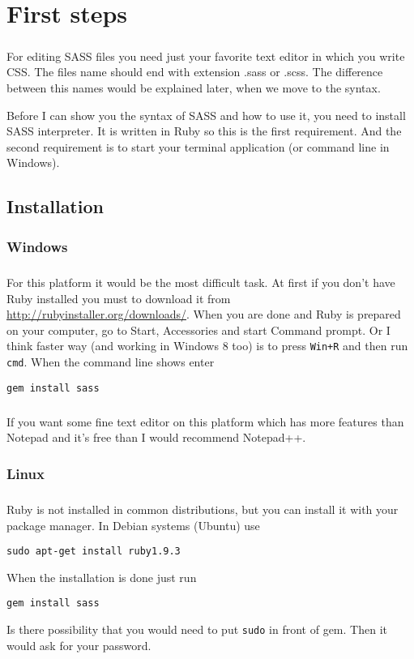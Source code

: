 \chapter{First steps}
\paragraph{}
For editing SASS files you need just your favorite text editor in which you write CSS. The files name should end with extension .sass or .scss. The difference between this names would be explained later, when we move to the syntax.

Before I can show you the syntax of SASS and how to use it, you need to install SASS interpreter. It is written in Ruby so this is the first requirement. And the second requirement is to start your terminal application (or command line in Windows).

\section{Installation}
\subsection{Windows}
\paragraph{}
For this platform it would be the most difficult task. At first if you don't have Ruby installed you must to download it from
\url{http://rubyinstaller.org/downloads/}. When you are done and Ruby is prepared on your computer, go to Start, Accessories and start Command prompt. Or I think faster way (and working in Windows 8 too) is to press \texttt{Win+R} and then run \texttt{cmd}. 
When the command line shows enter
\begin{verbatim}
gem install sass
\end{verbatim}
\paragraph{}
If you want some fine text editor on this platform which has more features than Notepad and it's free than I would recommend Notepad++.

\subsection{Linux}
\paragraph{}
Ruby is not installed in common distributions, but you can install it with your package manager. In Debian systems (Ubuntu) use
\begin{verbatim}
sudo apt-get install ruby1.9.3
\end{verbatim}
When the installation is done just run 
\begin{verbatim}
gem install sass
\end{verbatim}
Is there possibility that you would need  to put \texttt{sudo} in front of gem. Then it would ask for your password.

